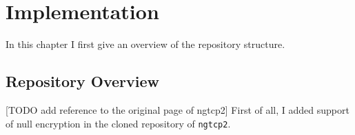 \documentclass[12pt,a4paper,twoside,openright]{report}
\begin{document}
    

\chapter{Implementation}








In this chapter I first give an overview of the repository structure.


\section{Repository Overview} 
[TODO add reference to the original page of ngtcp2]
First of all, I added support of null encryption in the cloned repository of \texttt{ngtcp2}.
\end{document}
